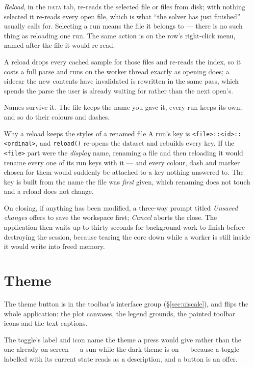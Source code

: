 \documentclass[11pt,a4paper,oneside]{report}
\newcommand{\code}[1]{\texttt{#1}}
\newcommand{\tab}[1]{\textsc{#1}}
\begin{document}
\emph{Reload}, in the \tab{data} tab, re-reads the selected file or files from
disk; with nothing selected it re-reads every open file, which is what ``the
solver has just finished'' usually calls for. Selecting a run means the file it
belongs to --- there is no such thing as reloading one run. The same action is
on the row's right-click menu, named after the file it would re-read.

A reload drops every cached sample for those files and re-reads the index, so
it costs a full parse and runs on the worker thread exactly as opening does; a
sidecar the new contents have invalidated is rewritten in the same pass, which
spends the parse the user is already waiting for rather than the next open's.

Names survive it. The file keeps the name you gave it, every run keeps its own,
and so do their colours and dashes.

\begin{aoenote}{Why a reload keeps the styles of a renamed file}
A run's key is \code{<file>::<id>::<ordinal>}, and \code{reload()} re-opens the
dataset and rebuilds every key. If the \code{<file>} part were the
\emph{display} name, renaming a file and then reloading it would rename every
one of its run keys with it --- and every colour, dash and marker chosen for
them would suddenly be attached to a key nothing answered to. The key is
built from the name the file was \emph{first} given, which renaming does not
touch and a reload does not change.
\end{aoenote}

On closing, if anything has been modified, a three-way prompt titled
\emph{Unsaved changes} offers to save the workspace first; \emph{Cancel} aborts
the close. The application then waits up to thirty seconds for background work
to finish before destroying the session, because tearing the core down while a
worker is still inside it would write into freed memory.

\section{Theme}
\label{sec:theme}

The theme button is in the toolbar's interface group (\S\ref{sec:uiscale}),
and flips the whole application: the plot canvases, the legend grounds, the
painted toolbar icons and the text captions.

The toggle's label and icon name the theme a press would give rather than the
one already on screen --- a sun while the dark theme is on --- because a toggle
labelled with its current state reads as a description, and a button is an
offer.
\end{document}
